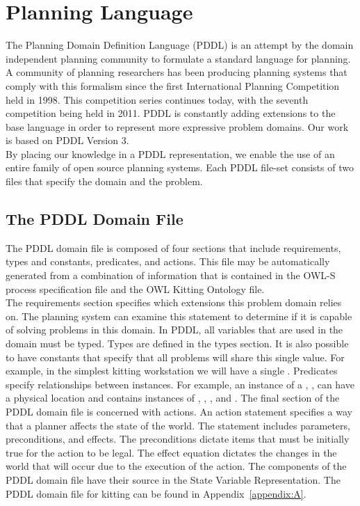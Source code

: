 
\section{Planning Language}\label{S:PDDL}
The Planning Domain Definition Language (PDDL) \cite{PDDL} is an attempt by the domain independent planning community to formulate a standard language for planning. A community
of planning researchers has been producing planning systems that comply with this formalism since the first International Planning Competition held in 1998. This competition series
continues today, with the seventh competition being held in 2011. PDDL is constantly adding extensions to the base language in order to represent more expressive problem domains. Our work is based on PDDL Version 3.\\

\noindent
By placing our knowledge in a PDDL representation, we enable the use of an entire family of open source planning systems.
Each PDDL file-set consists of two files that specify the domain and the problem.

\subsection{The PDDL Domain File}\label{S:PDDL-domain}
The PDDL domain file is composed of four sections that include
requirements, types and constants, predicates, and actions. This file may be automatically generated from a combination of information that is contained in the OWL-S process specification file and the OWL Kitting Ontology file.\\

\noindent
The requirements section specifies which extensions this problem domain relies on. The planning system can examine this statement to determine if it is capable of solving problems in this domain. In PDDL, all variables that are used in the domain must be typed. Types are defined in the $\mathrm{types}$ section. It is also possible to have constants that specify that all problems will share this single value. For example, in the simplest kitting workstation we will have a single  .
Predicates specify relationships between instances. For example, an instance of a , , can have a physical location and contains instances of , , , and . The final section of the PDDL domain file is concerned with actions. An action statement specifies a way that a planner affects the state of the world. The statement includes parameters, preconditions, and effects. The preconditions dictate items that must be initially true for the action to be legal. The effect equation dictates the changes in the world that will occur due to the execution of the action. The components of the PDDL domain file have their source in the State Variable Representation. The PDDL domain file for kitting can be found in Appendix~\ref{appendix:A}.



